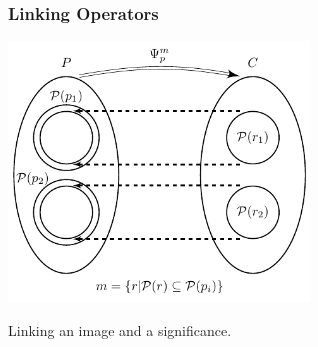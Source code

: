 \documentclass[default]{beamer}
\begin{document}
	\begin{frame}
		\frametitle{Linking Operators}
		\centering
		\includegraphics[page=1,width=0.6\textwidth]{signs/oper_relat}
		
		Linking an image and a significance.
	\end{frame}		
\end{document}
